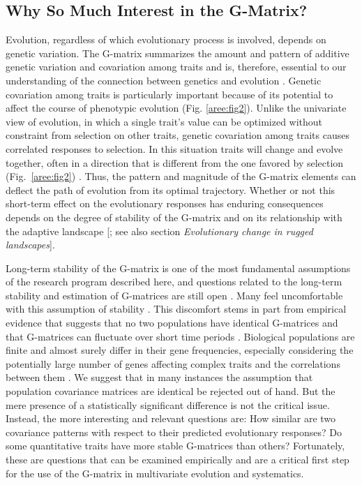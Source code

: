 \begin{refsection}
\subsection{Why So Much Interest in the G-Matrix?}

Evolution, regardless of which evolutionary process is involved, depends
on genetic variation. The G-matrix summarizes the amount and pattern of
additive genetic variation and covariation among traits and is,
therefore, essential to our understanding of the connection between
genetics and evolution \parencite{Lande1979-by}.
Genetic covariation among traits is particularly important because of
its potential to affect the course of phenotypic evolution
(Fig. \ref{aree:fig2}). Unlike the univariate
view of evolution, in which a single trait's value can be optimized
without constraint from selection on other traits, genetic covariation
among traits causes correlated responses to selection. In this situation
traits will change and evolve together, often in a direction that is
different from the one favored by selection
(Fig.~\ref{aree:fig2})
\parencite{Lande1979-by, Grant1995-er}. Thus, the pattern and
magnitude of the G-matrix elements can deflect the path of evolution
from its optimal trajectory. Whether or not this short-term effect on
the evolutionary responses has enduring consequences depends on the
degree of stability of the G-matrix and on its relationship with the
adaptive landscape [\textcite{Steppan2002-be}; see also section \emph{Evolutionary change in rugged
landscapes}].

Long-term stability of the G-matrix is one of the most fundamental
assumptions of the research program described here, and questions
related to the long-term stability and estimation of G-matrices are
still open \parencite{Houle2015-jb, Jones2012-aq}. Many feel
uncomfortable with this assumption of stability \parencite{Bjorklund2013-io}. This
discomfort stems in part from empirical evidence that suggests that no
two populations have identical G-matrices and that G-matrices can
fluctuate over short time periods \parencite{Bjorklund2013-io, Eroukhmanoff2011-ph}.
Biological populations are finite and almost surely differ in their gene
frequencies, especially considering the potentially large number of
genes affecting complex traits and the correlations between them \parencite{Phillips2001-xb, Whitlock2002-yb}. 
We suggest that in many instances the assumption that population covariance
matrices are identical be rejected out of hand. But the mere presence of
a statistically significant difference is not the critical issue.
Instead, the more interesting and relevant questions are: How similar
are two covariance patterns with respect to their predicted evolutionary
responses? Do some quantitative traits have more stable G-matrices than
others? Fortunately, these are questions that can be examined
empirically \parencite{Calsbeek2009-fl, Cheverud2007-yp} and
are a critical first step for the use of the G-matrix in multivariate
evolution and systematics.


\end{refsection}
